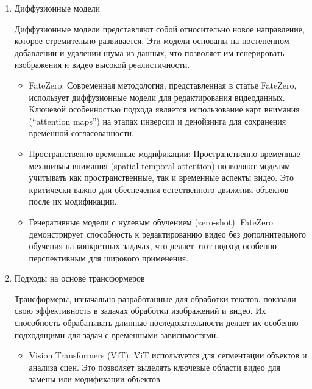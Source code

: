 \begin{enumerate}
\begin{itemize}
        \item Gated Recurrent Units (GRU): GRU предлагают упрощенную структуру по сравнению с LSTM, обеспечивая при этом схожую производительность. Они используются в задачах, где важна эффективность вычислений.
    \end{itemize}

    \item Диффузионные модели
    
    Диффузионные модели представляют собой относительно новое направление, которое стремительно развивается. Эти модели основаны на постепенном добавлении и удалении шума из данных, что позволяет им генерировать изображения и видео высокой реалистичности.

    \begin{itemize}
        \item FateZero: Современная методология, представленная в статье FateZero, использует диффузионные модели для редактирования видеоданных. Ключевой особенностью подхода является использование карт внимания (“attention maps”) на этапах инверсии и денойзинга для сохранения временной согласованности.

        \item Пространственно-временные модификации: Пространственно-временные механизмы внимания (spatial-temporal attention) позволяют моделям учитывать как пространственные, так и временные аспекты видео. Это критически важно для обеспечения естественного движения объектов после их модификации.
        \item Генеративные модели с нулевым обучением (zero-shot): FateZero демонстрирует способность к редактированию видео без дополнительного обучения на конкретных задачах, что делает этот подход особенно перспективным для широкого применения.
    \end{itemize}

    \item Подходы на основе трансформеров

    Трансформеры, изначально разработанные для обработки текстов, показали свою эффективность в задачах обработки изображений и видео. Их способность обрабатывать длинные последовательности делает их особенно подходящими для задач с временными зависимостями.

    \begin{itemize}
        \item Vision Transformers (ViT): ViT используется для сегментации объектов и анализа сцен. Это позволяет выделять ключевые области видео для замены или модификации объектов.


\end{itemize}
\end{enumerate}
